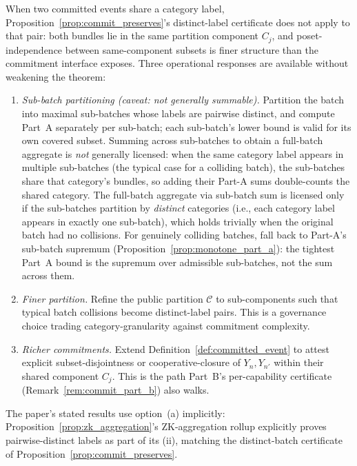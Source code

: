 \begin{remark}
\label{rem:label_collision}
When two committed events share a category label,
Proposition~\ref{prop:commit_preserves}'s distinct-label
certificate does not apply to that pair: both bundles lie in
the same partition component $C_j$, and poset-independence
between same-component subsets is finer structure than the
commitment interface exposes.  Three operational responses are
available without weakening the theorem:
\begin{enumerate}
\item[(a)] \emph{Sub-batch partitioning (caveat: not generally
  summable).} Partition the batch into maximal sub-batches
  whose labels are pairwise distinct, and compute Part~A
  separately per sub-batch; each sub-batch's lower bound is
  valid for its own covered subset.  Summing across sub-batches
  to obtain a full-batch aggregate is \emph{not} generally
  licensed: when the same category label appears in multiple
  sub-batches (the typical case for a colliding batch), the
  sub-batches share that category's bundles, so adding their
  Part-A sums double-counts the shared category.  The
  full-batch aggregate via sub-batch sum is licensed only if
  the sub-batches partition by \emph{distinct} categories
  (i.e., each category label appears in exactly one
  sub-batch), which holds trivially when the original batch
  had no collisions.  For genuinely colliding batches, fall
  back to Part-A's sub-batch supremum
  (Proposition~\ref{prop:monotone_part_a}): the tightest Part~A
  bound is the supremum over admissible sub-batches, not the
  sum across them.
\item[(b)] \emph{Finer partition.}  Refine the public partition
  $\mathcal{C}$ to sub-components such that typical batch
  collisions become distinct-label pairs.  This is a governance
  choice trading category-granularity against commitment
  complexity.
\item[(c)] \emph{Richer commitments.}  Extend
  Definition~\ref{def:committed_event} to attest explicit
  subset-disjointness or cooperative-closure of $Y_n, Y_{n'}$
  within their shared component $C_j$.  This is the path
  Part~B's per-capability certificate (Remark~\ref{rem:commit_part_b})
  also walks.
\end{enumerate}
The paper's stated results use option~(a) implicitly:
Proposition~\ref{prop:zk_aggregation}'s ZK-aggregation rollup
explicitly proves pairwise-distinct labels as part of its
(ii), matching the distinct-batch certificate of
Proposition~\ref{prop:commit_preserves}.
\end{remark}

